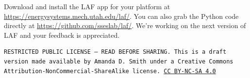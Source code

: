 \documentclass[10pt]{article}
\begin{document}
Download and install the LAF app for your platform at \url{https://energysystems.mech.utah.edu/laf/}. You can also grab the Python code directly at \url{https://github.com/sseslab/laf/}.  We're working on the next version of LAF and your feedback is appreciated.

\bigskip

\noindent
\texttt{\footnotesize RESTRICTED PUBLIC LICENSE --- READ BEFORE SHARING. This is a draft version made available by Amanda D. Smith under a Creative Commons Attribution-NonCommercial-ShareAlike license. 
\href{https://creativecommons.org/licenses/by-nc-sa/4.0/}{CC BY-NC-SA 4.0}}


\printbibliography
\end{document}
